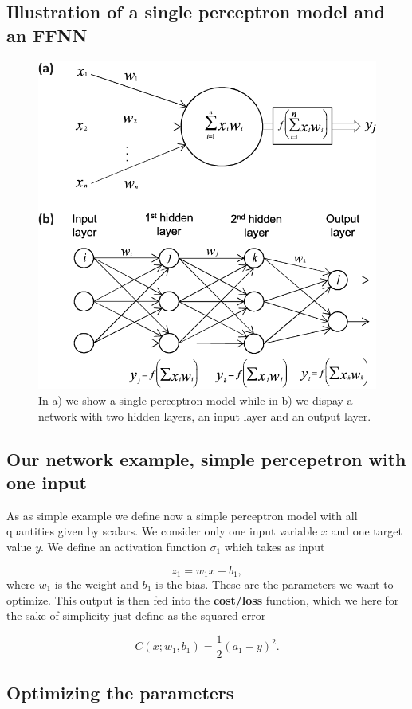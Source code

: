 \documentclass[%
oneside,                 %
final,                   %
10pt]{article}
\begin{document}
\subsection{Illustration of a single perceptron model and an FFNN}

\begin{figure}[!ht]  %
  \centerline{\includegraphics[width=0.7\linewidth]{figures/nns.png}}
  \caption{
  In a) we show a single perceptron model while in b) we dispay a network with two  hidden layers, an input layer and an output layer.
  }
\end{figure}

\subsection{Our network example, simple percepetron with one input}

As as simple example we define now a simple perceptron model with
all quantities given by scalars. We consider only one input variable
$x$ and one target value $y$.  We define an activation function
$\sigma_1$ which takes as input

\[
z_1 = w_1x+b_1,
\]
where $w_1$ is the weight and $b_1$ is the bias. These are the
parameters we want to optimize.  This output is then fed into the
\textbf{cost/loss} function, which we here for the sake of simplicity just
define as the squared error

\[
C(x;w_1,b_1)=\frac{1}{2}(a_1-y)^2.
\]

\subsection{Optimizing the parameters}
\end{document}
